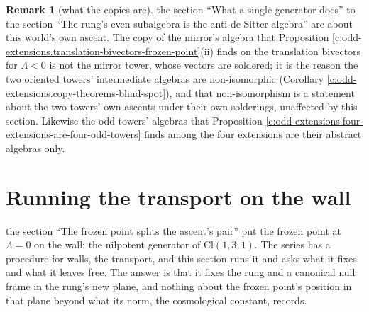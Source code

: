 \documentclass[11pt]{article}
\theoremstyle{definition}
\newtheorem{remark}[theorem]{Remark}
\theoremstyle{plain}
\providecommand{\Cl}{}\renewcommand{\Cl}{\mathrm{Cl}}
\begin{document}
\begin{remark}[what the copies are]\label{c:note.odd-extensions.what-copies-are}
the section ``What a single generator does'' to the section ``The rung's even subalgebra is the anti-de Sitter algebra'' are about this world's own ascent. The copy of the mirror's algebra that Proposition \ref{c:odd-extensions.translation-bivectors-frozen-point}(ii) finds on the translation bivectors for $\Lambda < 0$ is not the mirror tower, whose vectors are soldered; it is the reason the two oriented towers' intermediate algebras are non-isomorphic (Corollary \ref{c:odd-extensions.copy-theorems-blind-spot}), and that non-isomorphism is a statement about the two towers' own ascents under their own solderings, unaffected by this section. Likewise the odd towers' algebras that Proposition \ref{c:odd-extensions.four-extensions-are-four-odd-towers} finds among the four extensions are their abstract algebras only.
\end{remark}

\section{Running the transport on the wall}

\label{c:note.odd-extensions.setting-running-transport-wall}
the section ``The frozen point splits the ascent's pair'' put the frozen point at $\Lambda = 0$ on the wall: the nilpotent generator of $\Cl(1,3;1)$. The series has a procedure for walls, the transport, and this section runs it and asks what it fixes and what it leaves free. The answer is that it fixes the rung and a canonical null frame in the rung's new plane, and nothing about the frozen point's position in that plane beyond what its norm, the cosmological constant, records.
\end{document}

